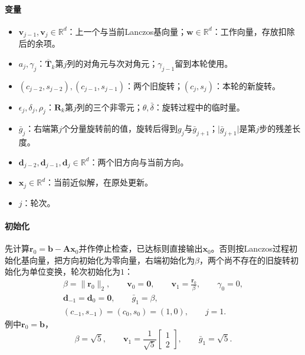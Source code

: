 \paragraph{变量}
\begin{itemize}
 \item $\bm v_{j-1},\bm v_j\in\mathbb R^d$：上一个与当前Lanczos基向量；$\bm w\in\mathbb R^d$：工作向量，存放扣除后的余项。
 \item $a_j,\gamma_j$：$\overline{\bm T}_k$第$j$列的对角元与次对角元；$\gamma_{j-1}$留到本轮使用。
 \item $(c_{j-2},s_{j-2}),(c_{j-1},s_{j-1})$：两个旧旋转；$(c_j,s_j)$：本轮的新旋转。
 \item $\epsilon_j,\delta_j,\rho_j$：$\bm R_k$第$j$列的三个非零元；$\theta,\bar\delta$：旋转过程中的临时量。
 \item $\bar g_j$：右端第$j$个分量旋转前的值，旋转后得到$g_j$与$\bar g_{j+1}$；$\lvert\bar g_{j+1}\rvert$是第$j$步的残差长度。
 \item $\bm d_{j-2},\bm d_{j-1},\bm d_j\in\mathbb R^d$：两个旧方向与当前方向。
 \item $\bm x_j\in\mathbb R^d$：当前近似解，在原处更新。
 \item $j$：轮次。
\end{itemize}

\paragraph{初始化}
先计算$\bm r_0=\bm b-\bm A\bm x_0$并作停止检查，已达标则直接输出$\bm x_0$。否则按Lanczos过程初始化基向量，把方向初始化为零向量，右端初始化为$\beta$，两个尚不存在的旧旋转初始化为单位变换，轮次初始化为$1$：
\[
 \begin{gathered}
 \beta=\lVert\bm r_0\rVert_2,\qquad \bm v_0=\bm 0,\qquad \bm v_1=\frac{\bm r_0}{\beta},\qquad \gamma_0=0,\\
 \bm d_{-1}=\bm d_0=\bm 0,\qquad \bar g_1=\beta,\\
 (c_{-1},s_{-1})=(c_0,s_0)=(1,0),\qquad j=1 .
 \end{gathered}
\]
例中$\bm r_0=\bm b$，
\[
 \beta=\sqrt5,\qquad \bm v_1=\frac1{\sqrt5}\begin{bmatrix}1\\2\end{bmatrix},\qquad \bar g_1=\sqrt5 .
\]

